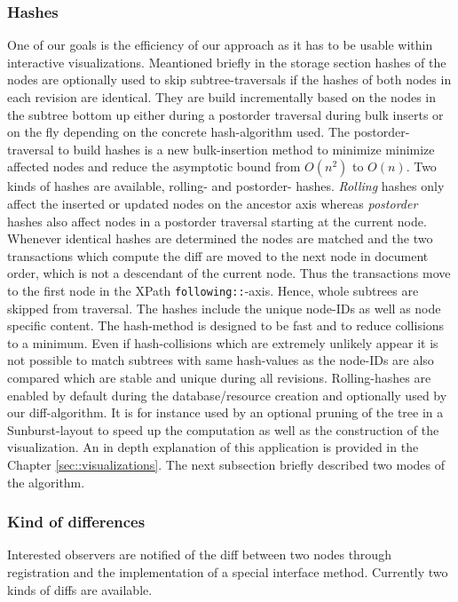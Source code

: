 \subsubsection{Hashes} One of our goals is the efficiency of our approach as it has to be usable within interactive visualizations. Meantioned briefly in the storage section hashes of the nodes are optionally used to skip subtree-traversals if the hashes of both nodes in each revision are identical. They are build incrementally based on the nodes in the subtree bottom up either during a postorder traversal during bulk inserts or on the fly depending on the concrete hash-algorithm used. The postorder-traversal to build hashes is a new bulk-insertion method to minimize minimize affected nodes and reduce the asymptotic bound from $O(n^2)$ to $O(n)$. Two kinds of hashes are available, rolling\cite{Rolling2011}- and postorder\cite{Integrity2010}- hashes. \emph{Rolling} hashes only affect the inserted or updated nodes on the ancestor axis whereas \emph{postorder} hashes also affect nodes in a postorder traversal starting at the current node. Whenever identical hashes are determined the nodes are matched and the two transactions which compute the diff are moved to the next node in document order, which is not a descendant of the current node. Thus the transactions move to the first node in the XPath \texttt{following::}-axis. Hence, whole subtrees are skipped from traversal. The hashes include the unique node-IDs as well as node specific content. The hash-method is designed to be fast and to reduce collisions to a minimum. Even if hash-collisions which are extremely unlikely appear it is not possible to match subtrees with same hash-values as the node-IDs are also compared which are stable and unique during all revisions. Rolling-hashes are enabled by default during the database/resource creation and optionally used by our diff-algorithm. It is for instance used by an optional pruning of the tree in a Sunburst-layout to speed up the computation as well as the construction of the visualization. An in depth explanation of this application is provided in the Chapter \ref{sec::visualizations}. The next subsection briefly described two modes of the algorithm.

\subsubsection{Kind of differences} Interested observers are notified of the diff between two nodes through registration and the implementation of a special interface method. Currently two kinds of diffs are available.

